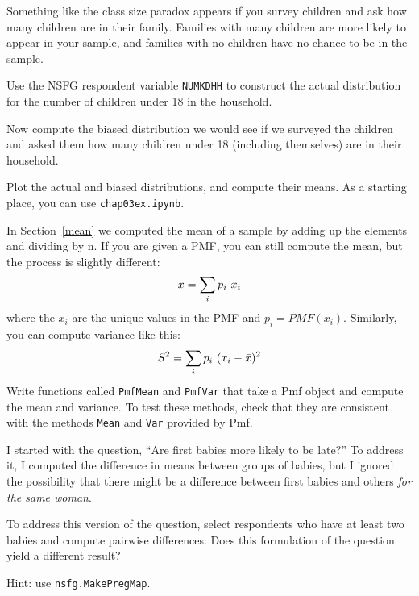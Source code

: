 \documentclass[12pt]{book}
\begin{document}
\begin{exercise}
Something like the class size paradox appears if you survey children
and ask how many children are in their family.  Families with many
children are more likely to appear in your sample, and
families with no children have no chance to be in the sample.

Use the NSFG respondent variable \verb"NUMKDHH" to construct the actual
distribution for the number of children under 18 in the household.

Now compute the biased distribution we would see if we surveyed the
children and asked them how many children under 18 (including themselves)
are in their household.  

Plot the actual and biased distributions, and compute their means.
As a starting place, you can use \verb"chap03ex.ipynb".
\end{exercise}


\begin{exercise}

In Section~\ref{mean} we computed the mean of a sample by adding up
the elements and dividing by n.  If you are given a PMF, you can
still compute the mean, but the process is slightly different:
%
\[ \bar{x} = \sum_i p_i~x_i \]
%
where the $x_i$ are the unique values in the PMF and $p_i=PMF(x_i)$.
Similarly, you can compute variance like this:
%
\[ S^2 = \sum_i p_i~(x_i - \bar{x})^2\]
% 
Write functions called \verb"PmfMean" and \verb"PmfVar" that take a
Pmf object and compute the mean and variance.  To test these methods,
check that they are consistent with the methods \verb"Mean" and \verb"Var"
provided by Pmf.

\end{exercise}


\begin{exercise}
I started with the question, ``Are first babies more likely
to be late?''  To address it, I computed the difference in
means between groups of babies, but I ignored the possibility
that there might be a difference between first babies and
others {\em for the same woman}.

To address this version of the question, select respondents who
have at least two babies and compute pairwise differences.  Does
this formulation of the question yield a different result?

Hint: use \verb"nsfg.MakePregMap".
\end{exercise}
\end{document}
